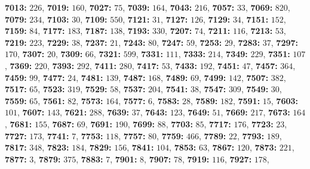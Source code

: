 \textsf{\bfseries 7013:} $226$, \textsf{\bfseries 7019:} $160$, \textsf{\bfseries 7027:} $75$, \textsf{\bfseries 7039:} $164$, \textsf{\bfseries 7043:} $216$, \textsf{\bfseries 7057:} $33$, \textsf{\bfseries 7069:} $820$, \textsf{\bfseries 7079:} $234$, \textsf{\bfseries 7103:} $30$, \textsf{\bfseries 7109:} $550$, \textsf{\bfseries 7121:} $31$, \textsf{\bfseries 7127:} $126$, \textsf{\bfseries 7129:} $34$, \textsf{\bfseries 7151:} $152$, \textsf{\bfseries 7159:} $84$, \textsf{\bfseries 7177:} $183$, \textsf{\bfseries 7187:} $138$, \textsf{\bfseries 7193:} $330$, \textsf{\bfseries 7207:} $74$, \textsf{\bfseries 7211:} $116$, \textsf{\bfseries 7213:} $53$, \textsf{\bfseries 7219:} $223$, \textsf{\bfseries 7229:} $38$, \textsf{\bfseries 7237:} $21$, \textsf{\bfseries 7243:} $80$, \textsf{\bfseries 7247:} $59$, \textsf{\bfseries 7253:} $29$, \textsf{\bfseries 7283:} $37$, \textsf{\bfseries 7297:} $170$, \textsf{\bfseries 7307:} $20$, \textsf{\bfseries 7309:} $66$, \textsf{\bfseries 7321:} $599$, \textsf{\bfseries 7331:} $111$, \textsf{\bfseries 7333:} $214$, \textsf{\bfseries 7349:} $229$, \textsf{\bfseries 7351:} $107$, \textsf{\bfseries 7369:} $220$, \textsf{\bfseries 7393:} $292$, \textsf{\bfseries 7411:} $280$, \textsf{\bfseries 7417:} $53$, \textsf{\bfseries 7433:} $192$, \textsf{\bfseries 7451:} $47$, \textsf{\bfseries 7457:} $364$, \textsf{\bfseries 7459:} $99$, \textsf{\bfseries 7477:} $24$, \textsf{\bfseries 7481:} $139$, \textsf{\bfseries 7487:} $168$, \textsf{\bfseries 7489:} $69$, \textsf{\bfseries 7499:} $142$, \textsf{\bfseries 7507:} $382$, \textsf{\bfseries 7517:} $65$, \textsf{\bfseries 7523:} $319$, \textsf{\bfseries 7529:} $58$, \textsf{\bfseries 7537:} $204$, \textsf{\bfseries 7541:} $38$, \textsf{\bfseries 7547:} $309$, \textsf{\bfseries 7549:} $30$, \textsf{\bfseries 7559:} $65$, \textsf{\bfseries 7561:} $82$, \textsf{\bfseries 7573:} $164$, \textsf{\bfseries 7577:} $6$, \textsf{\bfseries 7583:} $28$, \textsf{\bfseries 7589:} $182$, \textsf{\bfseries 7591:} $15$, \textsf{\bfseries 7603:} $101$, \textsf{\bfseries 7607:} $143$, \textsf{\bfseries 7621:} $288$, \textsf{\bfseries 7639:} $37$, \textsf{\bfseries 7643:} $123$, \textsf{\bfseries 7649:} $51$, \textsf{\bfseries 7669:} $217$, \textsf{\bfseries 7673:} $164$, \textsf{\bfseries 7681:} $155$, \textsf{\bfseries 7687:} $69$, \textsf{\bfseries 7691:} $190$, \textsf{\bfseries 7699:} $88$, \textsf{\bfseries 7703:} $85$, \textsf{\bfseries 7717:} $176$, \textsf{\bfseries 7723:} $23$, \textsf{\bfseries 7727:} $173$, \textsf{\bfseries 7741:} $7$, \textsf{\bfseries 7753:} $118$, \textsf{\bfseries 7757:} $80$, \textsf{\bfseries 7759:} $466$, \textsf{\bfseries 7789:} $22$, \textsf{\bfseries 7793:} $189$, \textsf{\bfseries 7817:} $348$, \textsf{\bfseries 7823:} $184$, \textsf{\bfseries 7829:} $156$, \textsf{\bfseries 7841:} $104$, \textsf{\bfseries 7853:} $63$, \textsf{\bfseries 7867:} $120$, \textsf{\bfseries 7873:} $221$, \textsf{\bfseries 7877:} $3$, \textsf{\bfseries 7879:} $375$, \textsf{\bfseries 7883:} $7$, \textsf{\bfseries 7901:} $8$, \textsf{\bfseries 7907:} $78$, \textsf{\bfseries 7919:} $116$, \textsf{\bfseries 7927:} $178$, 
